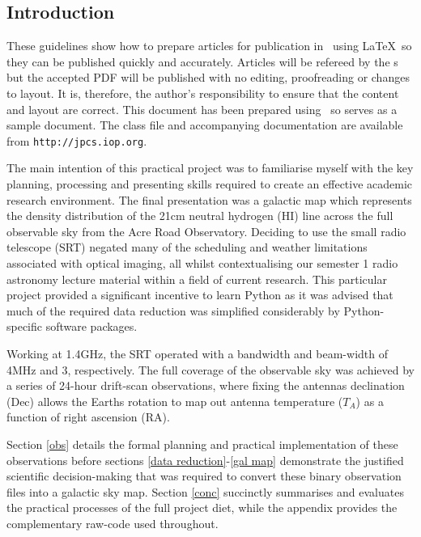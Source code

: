 \documentclass[a4paper]{jpconf}
\begin{document}
\begin{multicols}{2}

\section{Introduction}
These guidelines show how to prepare articles for publication in \jpcs\ using \LaTeX\ so they can be published quickly and accurately. Articles will be refereed by the \corg s but the accepted PDF will be published with no editing, proofreading or changes to layout. It is, therefore, the author's responsibility to ensure that the content and layout are correct.  This document has been prepared using \cls\ so serves as a sample document. The class file and accompanying documentation are available from \verb"http://jpcs.iop.org".

The main intention of this practical project was to familiarise myself with the key planning, processing and presenting skills required to create an effective academic research environment. The final presentation was a galactic map which represents the density distribution of the 21cm neutral hydrogen (HI) line across the full observable sky from the Acre Road Observatory. Deciding to use the small radio telescope (SRT) negated many of the scheduling and weather limitations associated with optical imaging, all whilst contextualising our semester 1 radio astronomy lecture material within a field of current research. This particular project provided a significant incentive to learn Python as it was advised that much of the required data reduction was simplified considerably by Python-specific software packages.

Working at 1.4GHz, the SRT operated with a bandwidth and beam-width of 4MHz and 3\degree, respectively. The full coverage of the observable sky was achieved by a series of 24-hour drift-scan observations, where fixing the antenna\textquotesingle s declination (Dec) allows the Earth\textquotesingle s rotation to map out antenna temperature ($T_{A}$) as a function of right ascension (RA).
 
Section \ref{obs} details the formal planning and practical implementation of these observations before sections \ref{data reduction}-\ref{gal map} demonstrate the justified scientific decision-making that was required to convert these binary observation files into a galactic sky map. Section \ref{conc} succinctly summarises and evaluates the practical processes of the full project diet, while the appendix provides the complementary raw-code used throughout.


\end{multicols}
\end{document}
